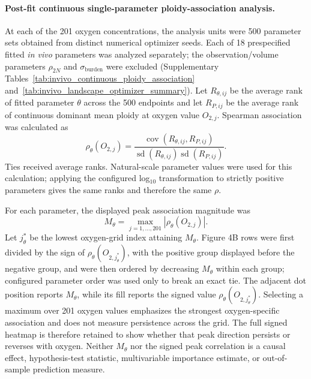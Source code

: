 \documentclass[11pt]{article}
\begin{document}
\paragraph{Post-fit continuous single-parameter ploidy-association analysis.}
At each of the 201 oxygen concentrations, the analysis units were 500 parameter sets obtained from distinct numerical optimizer seeds. Each of 18 prespecified fitted \textit{in vivo} parameters was analyzed separately; the observation/volume parameters $\rho_{2N}$ and $\sigma_{\mathrm{burden}}$ were excluded (Supplementary Tables~\ref{tab:invivo_continuous_ploidy_association} and~\ref{tab:invivo_landscape_optimizer_summary}). Let $R_{\theta,ij}$ be the average rank of fitted parameter $\theta$ across the 500 endpoints and let $R_{P,ij}$ be the average rank of continuous dominant mean ploidy at oxygen value $O_{2,j}$. Spearman association was calculated as
\begin{equation}
\rho_{\theta}(O_{2,j})
=
\frac{\operatorname{cov}\!\left(R_{\theta,ij},R_{P,ij}\right)}
{\operatorname{sd}\!\left(R_{\theta,ij}\right)
 \operatorname{sd}\!\left(R_{P,ij}\right)}.
\label{eq:appendix_continuous_ploidy_spearman}
\end{equation}
Ties received average ranks. Natural-scale parameter values were used for this calculation; applying the configured log$_{10}$ transformation to strictly positive parameters gives the same ranks and therefore the same $\rho$.

For each parameter, the displayed peak association magnitude was
\begin{equation}
M_{\theta}
=
\max_{j=1,\ldots,201}
\left|\rho_{\theta}(O_{2,j})\right|.
\label{eq:appendix_max_absolute_spearman}
\end{equation}
Let $j_\theta^*$ be the lowest oxygen-grid index attaining $M_\theta$. Figure 4B rows were first divided by the sign of $\rho_\theta(O_{2,j_\theta^*})$, with the positive group displayed before the negative group, and were then ordered by decreasing $M_\theta$ within each group; configured parameter order was used only to break an exact tie. The adjacent dot position reports $M_\theta$, while its fill reports the signed value $\rho_\theta(O_{2,j_\theta^*})$. Selecting a maximum over 201 oxygen values emphasizes the strongest oxygen-specific association and does not measure persistence across the grid. The full signed heatmap is therefore retained to show whether that peak direction persists or reverses with oxygen. Neither $M_\theta$ nor the signed peak correlation is a causal effect, hypothesis-test statistic, multivariable importance estimate, or out-of-sample prediction measure.
\end{document}
